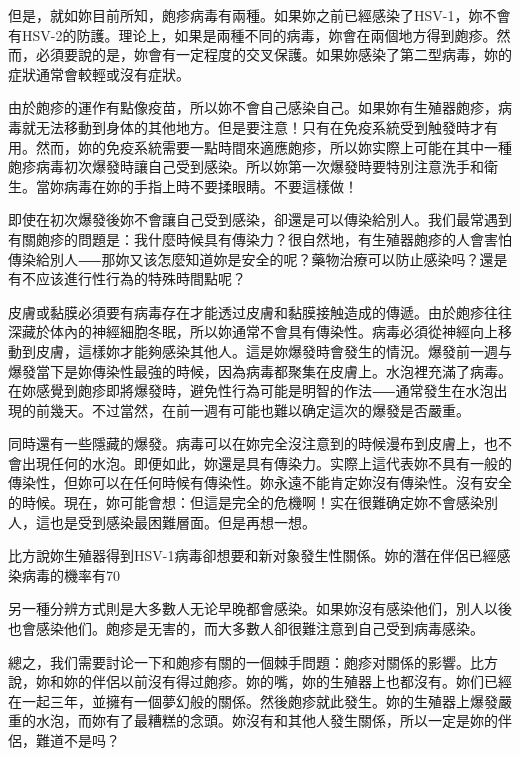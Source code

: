 \documentclass[12pt,UTF8]{ctexbook}
\begin{document}
但是，就如妳目前所知，皰疹病毒有兩種。如果妳之前已經感染了HSV-1，妳不會有HSV-2的防護。理论上，如果是兩種不同的病毒，妳會在兩個地方得到皰疹。然而，必須要說的是，妳會有一定程度的交叉保護。如果妳感染了第二型病毒，妳的症狀通常會較輕或沒有症狀。

由於皰疹的運作有點像疫苗，所以妳不會自己感染自己。如果妳有生殖器皰疹，病毒就无法移動到身体的其他地方。但是要注意！只有在免疫系統受到触發時才有用。然而，妳的免疫系統需要一點時間來適應皰疹，所以妳实際上可能在其中一種皰疹病毒初次爆發時讓自己受到感染。所以妳第一次爆發時要特別注意洗手和衛生。當妳病毒在妳的手指上時不要揉眼睛。不要這樣做！

即使在初次爆發後妳不會讓自己受到感染，卻還是可以傳染給別人。我们最常遇到有關皰疹的問題是：我什麼時候具有傳染力？很自然地，有生殖器皰疹的人會害怕傳染給別人⸺那妳又该怎麼知道妳是安全的呢？藥物治療可以防止感染吗？還是有不应该進行性行為的特殊時間點呢？

皮膚或黏膜必須要有病毒存在才能透过皮膚和黏膜接触造成的傳遞。由於皰疹往往深藏於体內的神經細胞冬眠，所以妳通常不會具有傳染性。病毒必須從神經向上移動到皮膚，這樣妳才能夠感染其他人。這是妳爆發時會發生的情況。爆發前一週与爆發當下是妳傳染性最強的時候，因為病毒都聚集在皮膚上。水泡裡充滿了病毒。在妳感覺到皰疹即將爆發時，避免性行為可能是明智的作法⸺通常發生在水泡出現的前幾天。不过當然，在前一週有可能也難以确定這次的爆發是否嚴重。

同時還有一些隱藏的爆發。病毒可以在妳完全沒注意到的時候漫布到皮膚上，也不會出現任何的水泡。即便如此，妳還是具有傳染力。实際上這代表妳不具有一般的傳染性，但妳可以在任何時候有傳染性。妳永遠不能肯定妳沒有傳染性。沒有安全的時候。現在，妳可能會想：但這是完全的危機啊！实在很難确定妳不會感染別人，這也是受到感染最困難層面。但是再想一想。

比方說妳生殖器得到HSV-1病毒卻想要和新对象發生性關係。妳的潛在伴侶已經感染病毒的機率有70%

另一種分辨方式則是大多數人无论早晚都會感染。如果妳沒有感染他们，別人以後也會感染他们。皰疹是无害的，而大多數人卻很難注意到自己受到病毒感染。

總之，我们需要討论一下和皰疹有關的一個棘手問題：皰疹对關係的影響。比方說，妳和妳的伴侶以前沒有得过皰疹。妳的嘴，妳的生殖器上也都沒有。妳们已經在一起三年，並擁有一個夢幻般的關係。然後皰疹就此發生。妳的生殖器上爆發嚴重的水泡，而妳有了最糟糕的念頭。妳沒有和其他人發生關係，所以一定是妳的伴侶，難道不是吗？
\end{document}
